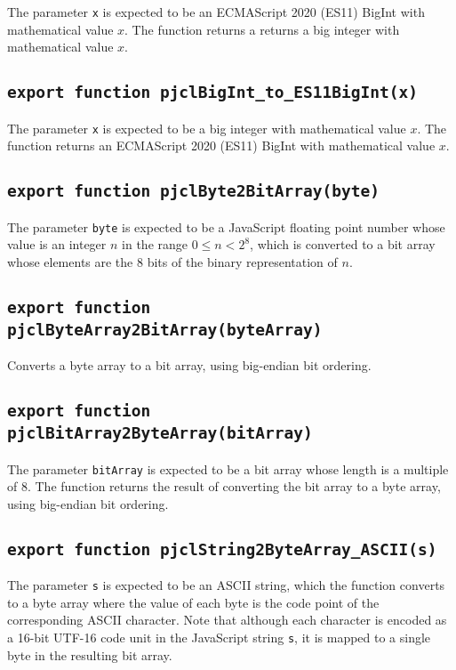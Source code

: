 \documentclass[12pt]{article}
\begin{document}
The parameter {\tt x} is expected to be an ECMAScript 2020 (ES11) BigInt with
mathematical value $x$.
The function returns a returns a big integer with mathematical value $x$.

\subsection{\tt export function pjclBigInt_to_ES11BigInt(x)}

The parameter {\tt x} is expected to be a big integer with mathematical value $x$.
The function returns an ECMAScript 2020 (ES11) BigInt with mathematical value $x$.

\subsection{\tt export function pjclByte2BitArray(byte)}

The parameter {\tt byte} is expected to be a JavaScript floating point
number whose value is an integer $n$ in the range $0\leq n < 2^8$,
which is converted to a bit array whose elements are the 8 bits of the
binary representation of $n$.

\subsection{\tt export function pjclByteArray2BitArray(byteArray)}

Converts a byte array to a bit array, using big-endian bit ordering. 

\subsection{\tt export function pjclBitArray2ByteArray(bitArray)}

The parameter {\tt bitArray} is expected to be a bit array whose length
is a multiple of 8.  The function returns the result of converting the bit array to
a byte array, using big-endian bit ordering. 

\subsection{\tt export function pjclString2ByteArray\_ASCII(s)}

The parameter {\tt s} is expected to be an ASCII string, which the
function converts to a byte array where the value of each byte is the 
code point of the corresponding ASCII character.  Note that although 
each character is encoded as a 16-bit UTF-16 code unit in the JavaScript string {\tt s}, 
it is mapped to a single byte in the resulting bit array.
\end{document}

